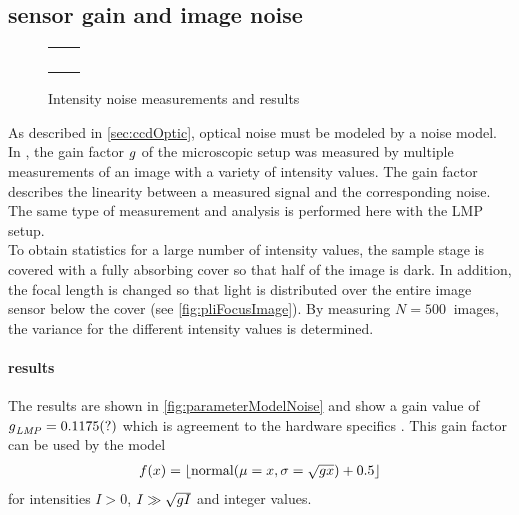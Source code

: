 \subsection{sensor gain and image noise}\label{sec:sensorGain}
%
\begin{figure}[!t]
\centering
%
\setlength{\tikzwidth}{0.3\textwidth}
\setlength{\tikzheight}{0.3\textwidth}
%
\setlength{\tabcolsep}{0em}
\begin{tabular}{C{0.5\textwidth}C{0.5\textwidth}}
&
\\[-1em]
%
 &
 \\[2em]
%
&
\\[-1em]
%
 &
\end{tabular}
%
\caption[Noise analysis]{Intensity noise measurements and results}
\label{fig:parameterModelGain}
\end{figure}
%
As described in \cref{sec:ccdOptic}, optical noise must be modeled by a noise model.
In \cite{Wiese:887678}, the gain factor $\textnormal{$g$}$ of the microscopic setup was measured by multiple measurements of an image with a variety of intensity values.
The gain factor describes the linearity between a measured signal and the corresponding noise.
The same type of measurement and analysis is performed here with the \ac{LMP} setup.
\\
To obtain statistics for a large number of intensity values, the sample stage is covered with a fully absorbing cover so that half of the image is dark.
In addition, the focal length is changed so that light is distributed over the entire image sensor below the cover (see \cref{fig:pliFocusImage}).
By measuring $N=\SI{500}{}$ images, the variance for the different intensity values is determined.
%
\paragraph{results}
The results are shown in \cref{fig:parameterModelNoise} and show a gain value of $\textnormal{$g$}_{\mathit{LMP}} = \SI{0.1175}{}(?)$ which is agreement to the hardware specifics .
This gain factor can be used by the model
\begin{align}
f(x) = \lfloor\mathrm{normal}(\mu = x, \sigma=\sqrt{\textnormal{$g$} x})+0.5\rfloor
\end{align}
for intensities $I > 0$, $I \gg \sqrt{\textnormal{$g$} I}$ and integer values.
%
%
%
